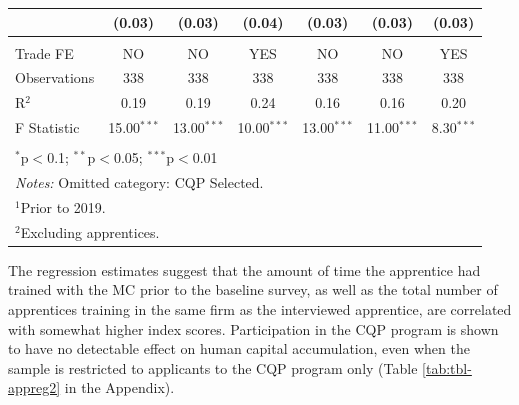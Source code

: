 \documentclass[
  a4paper, twoside, 12pt]{book}
\begin{document}
\begin{singlespacing}
\begin{table}[H]
\begin{tabular}{@{\extracolsep{-4pt}}lcccccc}
  & (0.03) & (0.03) & (0.04) & (0.03) & (0.03) & (0.03) \\ 
 \hline \\[-1.8ex] 
Trade FE & NO & NO & YES & NO & NO & YES \\ 
Observations & 338 & 338 & 338 & 338 & 338 & 338 \\ 
R$^{2}$ & 0.19 & 0.19 & 0.24 & 0.16 & 0.16 & 0.20 \\ 
F Statistic & 15.00$^{***}$ & 13.00$^{***}$ & 10.00$^{***}$ & 13.00$^{***}$ & 11.00$^{***}$ & 8.30$^{***}$ \\ 
\hline 
\hline \\[-1.8ex] 
\multicolumn{7}{l}{$^{*}$p$<$0.1; $^{**}$p$<$0.05; $^{***}$p$<$0.01} \\ 
\multicolumn{7}{l}{\textit{Notes:} Omitted category: CQP Selected.} \\ 
\multicolumn{7}{l}{$^1$Prior to 2019.} \\ 
\multicolumn{7}{l}{$^2$Excluding apprentices.} \\ 
\end{tabular} 
\end{table} 
\end{singlespacing}

The regression estimates suggest that the amount of time the apprentice had trained with the MC prior to the baseline survey, as well as the total number of apprentices training in the same firm as the interviewed apprentice, are correlated with somewhat higher index scores. Participation in the CQP program is shown to have no detectable effect on human capital accumulation, even when the sample is restricted to applicants to the CQP program only (Table \ref{tab:tbl-appreg2} in the Appendix).
\end{document}
